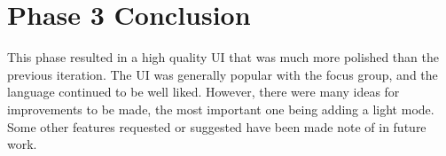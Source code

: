 \section{Phase 3 Conclusion}
This phase resulted in a high quality UI that was much more polished than the previous iteration. The UI was generally popular with the focus group, and the language continued to be well liked. However, there were many ideas for improvements to be made, the most important one being adding a light mode. Some other features requested or suggested have been made note of in future work. 


